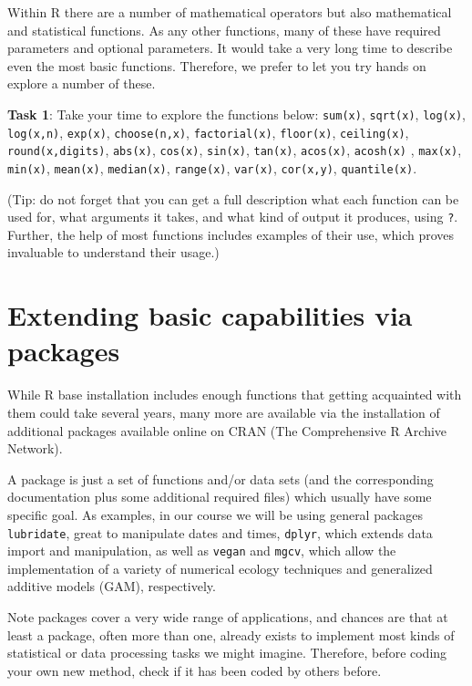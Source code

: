 \documentclass[
  letterpaper,
  DIV=11,
  numbers=noendperiod]{scrartcl}
\begin{document}
Within R there are a number of mathematical operators but also
mathematical and statistical functions. As any other functions, many of
these have required parameters and optional parameters. It would take a
very long time to describe even the most basic functions. Therefore, we
prefer to let you try hands on explore a number of these.

\textbf{Task 1}: Take your time to explore the functions below:
\texttt{sum(x)}, \texttt{sqrt(x)}, \texttt{log(x)}, \texttt{log(x,n)},
\texttt{exp(x)}, \texttt{choose(n,x)}, \texttt{factorial(x)},
\texttt{floor(x)}, \texttt{ceiling(x)}, \texttt{round(x,digits)},
\texttt{abs(x)}, \texttt{cos(x)}, \texttt{sin(x)}, \texttt{tan(x)},
\texttt{acos(x)}, \texttt{acosh(x)} , \texttt{max(x)}, \texttt{min(x)},
\texttt{mean(x)}, \texttt{median(x)}, \texttt{range(x)},
\texttt{var(x)}, \texttt{cor(x,y)}, \texttt{quantile(x)}.

(Tip: do not forget that you can get a full description what each
function can be used for, what arguments it takes, and what kind of
output it produces, using \texttt{?}. Further, the help of most
functions includes examples of their use, which proves invaluable to
understand their usage.)

\section{Extending basic capabilities via
packages}\label{extending-basic-capabilities-via-packages}

While R base installation includes enough functions that getting
acquainted with them could take several years, many more are available
via the installation of additional packages available online on CRAN
(The Comprehensive R Archive Network).

A package is just a set of functions and/or data sets (and the
corresponding documentation plus some additional required files) which
usually have some specific goal. As examples, in our course we will be
using general packages \texttt{lubridate}, great to manipulate dates and
times, \texttt{dplyr}, which extends data import and manipulation, as
well as \texttt{vegan} and \texttt{mgcv}, which allow the implementation
of a variety of numerical ecology techniques and generalized additive
models (GAM), respectively.

Note packages cover a very wide range of applications, and chances are
that at least a package, often more than one, already exists to
implement most kinds of statistical or data processing tasks we might
imagine. Therefore, before coding your own new method, check if it has
been coded by others before.
\end{document}
